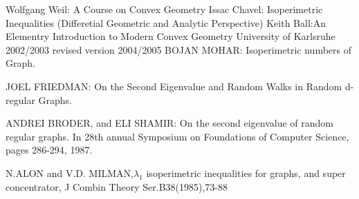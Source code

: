 \documentclass[oneside]{book}
\theoremstyle{definition}
\begin{document}
  
\begin{thebibliography}{300}
 \label{t:21} 
Wolfgang Weil: A Course
on
Convex Geometry
Issac Chavel: Isoperimetric Inequalities (Differetial Geometric and Analytic Perspective)
Keith Ball:An Elementry Introduction to Modern Convex Geometry
University of Karlsruhe
2002/2003
revised version 2004/2005
     BOJAN MOHAR: Isoperimetric numbers of Graph.
     
    
     JOEL FRIEDMAN: On the Second Eigenvalue and Random Walks in Random d-regular Graphs.
     
     ANDREI BRODER, and ELI SHAMIR: On the second eigenvalue of random regular graphs. In 28th annual Symposium on Foundations of Computer Science, pages 286-294, 1987. 
     
      N.ALON and V.D. MILMAN,$\lambda_{1}$ isoperimetric inequalities for graphs, and super concentrator, J Combin Theory Ser.B38(1985),73-88  
  \end{thebibliography}  
    
       
    
 
 
 
 
 
 
     
       
       
       
       
       
       
       
       
       
       
       
       
       
       
       
       
       
       
       
       
       
       
       
       
       
       
       
       
       
       
       
       
       
       
       
       
       
       
       
       
       
       
       
       
       
       
       
       
       
       
       
       
       
       
       
       
       
       
       
       
       
       
       
       
       
       
       
       
       
       
       
     
\end{document}
